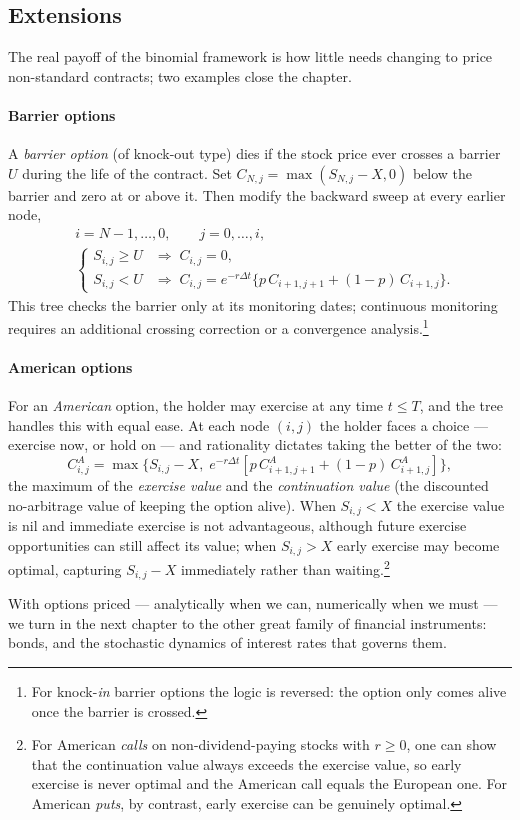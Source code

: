 \subsection{Extensions}\label{sec:crr-extensions}

The real payoff of the binomial framework is how little needs changing to price non-standard contracts; two examples close the chapter.

\paragraph*{Barrier options}

A \emph{barrier option} (of knock-out type) dies if the stock price ever crosses a barrier $U$ during the life of the contract.
Set $C_{N,j}=\max(S_{N,j}-X,0)$ below the barrier and zero at or above it.
Then modify the backward sweep at every earlier node,
\begin{equation}
\begin{aligned}
&i=N-1,\ldots,0,\qquad j=0,\ldots,i,\\
&\begin{cases}
S_{i,j} \ge U &\Longrightarrow\; C_{i,j} = 0, \\
S_{i,j} < U &\Longrightarrow\; C_{i,j} = e^{-r\Delta t}\bigl\{p\, C_{i+1,j+1} + (1-p)\, C_{i+1,j}\bigr\}.
\end{cases}
\end{aligned}
\end{equation}
This tree checks the barrier only at its monitoring dates; continuous monitoring requires an additional crossing correction or a convergence analysis.\footnote{For knock-\emph{in} barrier options the logic is reversed: the option only comes alive once the barrier is crossed.}

\paragraph*{American options}

For an \emph{American} option, the holder may exercise at any time $t\le T$, and the tree handles this with equal ease.
At each node $(i,j)$ the holder faces a choice --- exercise now, or hold on --- and rationality dictates taking the better of the two:
\begin{equation}\label{eq:american-option}
C^A_{i,j} = \max\!\bigl\{S_{i,j} - X,\; e^{-r\Delta t}[p\, C^A_{i+1,j+1} + (1-p)\, C^A_{i+1,j}]\bigr\},
\end{equation}
the maximum of the \emph{exercise value} and the \emph{continuation value} (the discounted no-arbitrage value of keeping the option alive).
When $S_{i,j} < X$ the exercise value is nil and immediate exercise is not advantageous, although future exercise opportunities can still affect its value; when $S_{i,j} > X$ early exercise may become optimal, capturing $S_{i,j}-X$ immediately rather than waiting.\footnote{For American \emph{calls} on non-dividend-paying stocks with $r\ge0$, one can show that the continuation value always exceeds the exercise value, so early exercise is never optimal and the American call equals the European one. For American \emph{puts}, by contrast, early exercise can be genuinely optimal.}

With options priced --- analytically when we can, numerically when we must --- we turn in the next chapter to the other great family of financial instruments: bonds, and the stochastic dynamics of interest rates that governs them.
